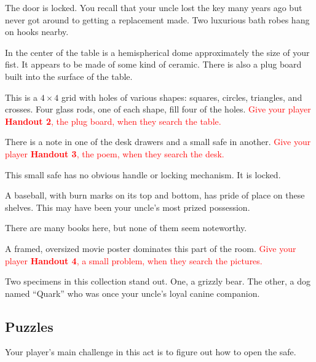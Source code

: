 \documentclass[a6paper, parskip=half, DIV=14, 12pt]{scrartcl}
\begin{document}
\begin{description}[leftmargin=0pt]
\item[Door (E)] The door is locked. You recall that your uncle lost the key many years ago but never got around to getting a replacement made. Two luxurious bath robes hang on hooks nearby.%
\item[Table (C)] In the center of the table is a hemispherical dome approximately the size of your fist. It appears to be made of some kind of ceramic.
There is also a plug board built into the surface of the table.
\item[Plug Board (C)] This is a $4 \times 4$ grid with holes of various shapes: squares, circles, triangles, and crosses. Four glass rods, one of each shape, fill four of the holes. \textcolor{Red}{Give your player \textbf{Handout 2}, the plug board, when they search the table.}
\item[Desk (W)] There is a note in one of the desk drawers and a small safe in another. \textcolor{Red}{Give your player \textbf{Handout 3}, the poem, when they search the desk.}
\item[Safe (W)] This small safe has no obvious handle or locking mechanism. It is locked.
\item[Shelves (NW)] A baseball, with burn marks on its top and bottom, has pride of place on these shelves. This may have been your uncle's most prized possession.
\item[Bookcases (NE)] There are many books here, but none of them seem noteworthy.
\item[Pictures (SE)] A framed, oversized movie poster dominates this part of the room. \textcolor{Red}{Give your player \textbf{Handout 4}, a small problem, when they search the pictures.}
\item[Animals (SW)] Two specimens in this collection stand out. One, a grizzly bear. The other, a dog named ``Quark'' who was once your uncle's loyal canine companion.
\end{description}

\subsection*{Puzzles}
Your player's main challenge in this act is to figure out how to open the safe.
\end{document}
